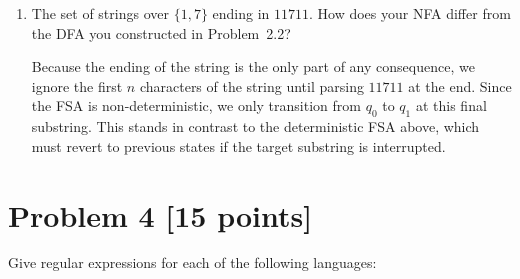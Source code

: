 \documentclass[11pt]{article}
\begin{document}
\begin{enumerate}

\item The set of strings over $\{1,7\}$ ending in $11711$.
How does your NFA differ from the DFA you constructed in Problem~2.2?


Because the ending of the string is the only part of any consequence, we ignore the first $n$ characters of the string until parsing $11711$ at the end. Since the FSA is non-deterministic, we only transition from $q_0$ to $q_1$ at this final substring. This stands in contrast to the deterministic FSA above, which must revert to previous states if the target substring is interrupted.


\end{enumerate}

\section*{Problem 4 [15 points]}

Give regular expressions for each of the following languages:
\end{document}

